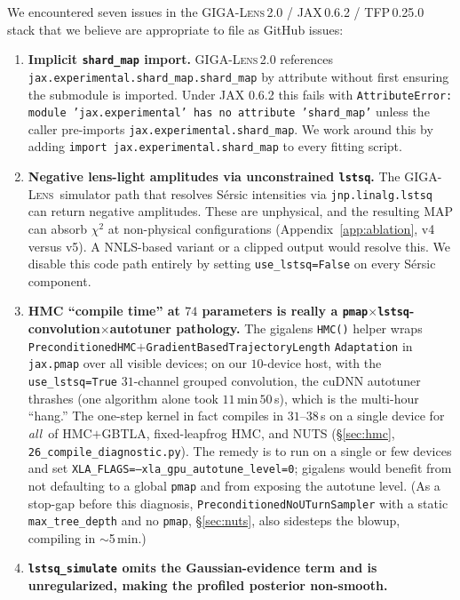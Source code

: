 \documentclass[11pt,letterpaper]{article}
\newcommand{\gigalens}{\textsc{GIGA-Lens}}
\begin{document}
We encountered seven issues in the \gigalens\,2.0 / JAX\,0.6.2 /
TFP\,0.25.0 stack that we believe are appropriate to file as GitHub
issues:
\begin{enumerate}
\item \textbf{Implicit \texttt{shard\_map} import.} \gigalens\,2.0
references \texttt{jax.experimental.shard\_map.shard\_map} by attribute
without first ensuring the submodule is imported. Under JAX 0.6.2 this
fails with \texttt{AttributeError: module 'jax.experimental' has no
attribute 'shard\_map'} unless the caller pre-imports
\texttt{jax.experimental.shard\_map}. We work around this by adding
\texttt{import jax.experimental.shard\_map} to every fitting script.
\item \textbf{Negative lens-light amplitudes via unconstrained
\texttt{lstsq}.} The \gigalens\ simulator path that resolves S\'{e}rsic
intensities via \texttt{jnp.linalg.lstsq} can return negative
amplitudes. These are unphysical, and the resulting MAP can absorb
$\chi^{2}$ at non-physical configurations (Appendix~\ref{app:ablation},
v4 versus v5). A NNLS-based variant or a clipped output would resolve
this. We disable this code path entirely by setting
\texttt{use\_lstsq=False} on every S\'{e}rsic component.
\item \textbf{HMC ``compile time'' at $74$ parameters is really a
\texttt{pmap}$\times$\texttt{lstsq}-convolution$\times$autotuner
pathology.} The gigalens \texttt{HMC()} helper wraps
\texttt{PreconditionedHMC}$+$\texttt{GradientBasedTrajectoryLength}
\texttt{Adaptation} in \texttt{jax.pmap} over all visible devices; on
our $10$-device host, with the \texttt{use\_lstsq=True} $31$-channel
grouped convolution, the cuDNN autotuner thrashes (one algorithm alone
took $11$\,min\,$50$\,s), which is the multi-hour ``hang.'' The one-step
kernel in fact compiles in $31$--$38$\,s on a single device for {\it all}\
of HMC$+$GBTLA, fixed-leapfrog HMC, and NUTS (\S\ref{sec:hmc},
\texttt{26\_compile\_diagnostic.py}). The remedy is to run on a single
or few devices and set
\texttt{XLA\_FLAGS=--xla\_gpu\_autotune\_level=0}; gigalens would benefit
from not defaulting to a global \texttt{pmap} and from exposing the
autotune level. (As a stop-gap before this diagnosis,
\texttt{PreconditionedNoUTurnSampler} with a static
\texttt{max\_tree\_depth} and no \texttt{pmap}, \S\ref{sec:nuts}, also
sidesteps the blowup, compiling in $\sim$5\,min.)
\item \textbf{\texttt{lstsq\_simulate} omits the Gaussian-evidence term
and is unregularized, making the profiled posterior non-smooth.}

\end{enumerate}
\end{document}
